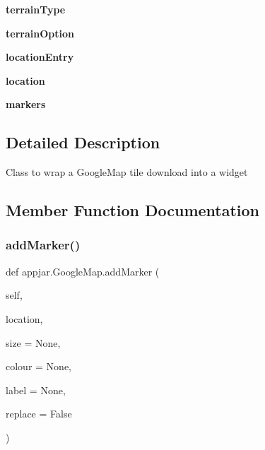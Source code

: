 \begin{DoxyCompactItemize}
{\bfseries terrain\+Type}
\item 
\mbox{\label{classappjar_1_1_google_map_a7cb351b70cd744c1d17379f79b2d9d20}} 
{\bfseries terrain\+Option}
\item 
\mbox{\label{classappjar_1_1_google_map_ac2082b2fa07b55ae230ea77fba3621db}} 
{\bfseries location\+Entry}
\item 
\mbox{\label{classappjar_1_1_google_map_a7dad4a203f1344f189cf1534c444c8d1}} 
{\bfseries location}
\item 
\mbox{\label{classappjar_1_1_google_map_a18540ed063bad1773404131ae572281e}} 
{\bfseries markers}
\end{DoxyCompactItemize}


\subsection{Detailed Description}
\begin{DoxyVerb}Class to wrap a GoogleMap tile download into a widget\end{DoxyVerb}
 

\subsection{Member Function Documentation}
\mbox{\label{classappjar_1_1_google_map_ab0ae68a5515362ae82dc3760bf6580a4}} 
\subsubsection{\texorpdfstring{add\+Marker()}{addMarker()}}
{\footnotesize\ttfamily def appjar.\+Google\+Map.\+add\+Marker (\begin{DoxyParamCaption}\item[{}]{self,  }\item[{}]{location,  }\item[{}]{size = {\ttfamily None},  }\item[{}]{colour = {\ttfamily None},  }\item[{}]{label = {\ttfamily None},  }\item[{}]{replace = {\ttfamily False} }\end{DoxyParamCaption})}

